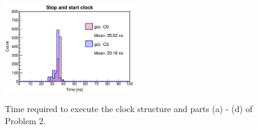 \documentclass[singlepage,notitlepage,nofootinbib,12pt]{revtex4-1}
\begin{document}
\begin{figure}[h]
  \centering
  \includegraphics[width=0.5\textwidth]{figures/clock.eps}
  \\
\caption{Time required to execute the clock structure and parts (a) - (d) of Problem 2.}
\end{figure} 
\end{document}
